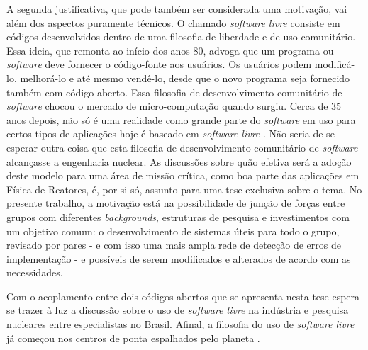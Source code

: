 A segunda justificativa, que pode também ser considerada uma motivação, vai além dos aspectos puramente técnicos.
O chamado \textit{software livre} consiste em códigos desenvolvidos dentro de uma filosofia de liberdade e de uso
comunitário. Essa ideia, que remonta ao início dos anos 80, advoga que um programa ou \textit{software} deve fornecer
o código-fonte aos usuários. Os usuários podem modificá-lo, melhorá-lo e até mesmo vendê-lo, desde que o novo
programa seja fornecido também com código aberto. Essa filosofia de desenvolvimento comunitário de \textit{software}
chocou o mercado de micro-computação quando surgiu. Cerca de 35 anos depois, não só é uma realidade como
grande parte do \textit{software} em uso para certos tipos de aplicações hoje é baseado em \textit{software livre}
\cite{Androutsellis2010}. Não seria de se esperar outra coisa que esta filosofia de desenvolvimento comunitário de
\textit{software} alcançasse a engenharia nuclear. As discussões sobre quão efetiva será a adoção deste modelo
para uma área de missão crítica, como boa parte das aplicações em Física de Reatores, é, por si só, assunto para uma
tese exclusiva sobre o tema. No presente trabalho, a motivação está na possibilidade de junção de forças entre grupos com
diferentes \textit{backgrounds}, estruturas de pesquisa e investimentos com um objetivo comum: o desenvolvimento
de sistemas úteis para todo o grupo, revisado por pares - e com isso uma mais ampla rede de detecção de erros
de implementação - e possíveis de serem modificados e alterados de acordo com as necessidades.

Com o acoplamento entre dois códigos abertos que se apresenta nesta tese espera-se trazer à luz a discussão sobre o uso de \textit{software livre} na
indústria e pesquisa nucleares entre especialistas no Brasil. Afinal, a filosofia do uso de \textit{software livre}
já começou nos centros de ponta espalhados pelo planeta \cite{Romano2013, Boyd2014, Huff2016}.





